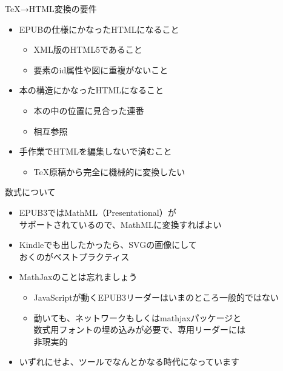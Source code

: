 \begin{frame}[t]{\inhibitglue \TeX{}→HTML変換の要件}
  \sffamily

  \begin{itemize}
    \item EPUBの仕様にかなったHTMLになること\\
    \begin{itemize}
      \item XML版のHTML5であること
      \item 要素のid属性や図に重複がないこと
    \end{itemize}
    \item 本の構造にかなったHTMLになること\\
    \begin{itemize}
      \item 本の中の位置に見合った連番
      \item 相互参照
    \end{itemize}
    \item 手作業でHTMLを編集しないで済むこと\\
    \begin{itemize}
      \item \TeX{}原稿から完全に機械的に変換したい
    \end{itemize}
  \end{itemize}
\end{frame}

\begin{frame}[t]{\inhibitglue 数式について}
  \sffamily
  \begin{itemize}
    \item EPUB3ではMathML（Presentational）が\\ サポートされているので、MathMLに変換すればよい
    \item Kindleでも出したかったら、SVGの画像にして\\ おくのがベストプラクティス
    \item MathJaxのことは忘れましょう\\
      \begin{itemize}
        \item JavaScriptが動くEPUB3リーダーはいまのところ一般的ではない
        \item 動いても、ネットワークもしくはmathjaxパッケージと\\ 数式用フォントの埋め込みが必要で、専用リーダーには\\ 非現実的
      \end{itemize}
    \pause
    \item いずれにせよ、ツールでなんとかなる時代になっています
  \end{itemize}
\end{frame}

